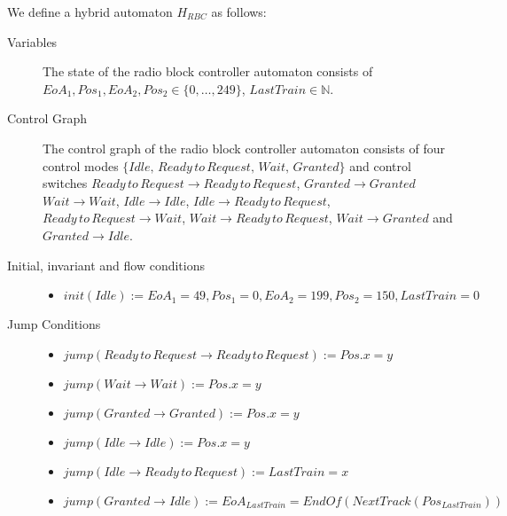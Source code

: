 \begin{mydef}

We define a hybrid automaton $H_{RBC}$ as follows:
\begin{description}
\item[Variables] The state of the radio block controller automaton consists of $EoA_1, Pos_1, EoA_2, Pos_2 \in  \{0, \ldots , 249\}$, $LastTrain \in \mathbb{N}$.

\item[Control Graph] The control graph of the radio block controller automaton consists of four control modes $\{Idle, \, Ready \, to \, Request, \, Wait, \, Granted \}$ and control switches $Ready \, to \, Request \to Ready \, to \, Request$, $Granted \to Granted$ $Wait \to Wait$, $Idle \to Idle$, $Idle \to Ready \, to \, Request$, $Ready \, to \, Request \to Wait$, $Wait \to Ready \, to \, Request$, $Wait \to Granted$ and $Granted \to Idle$.

\item[Initial, invariant and flow conditions] \hspace*{0mm}
	\begin{itemize}
	\item $init(Idle) :=   EoA_1 = 49, Pos_1 = 0, EoA_2 = 199, Pos_2 = 150, LastTrain = 0 $
	\end{itemize}

\item[Jump Conditions] \hspace*{0mm}

	\begin{itemize}
	\item $jump(Ready \, to \, Request \to Ready \, to \, Request) :=  Pos.x = y$
	\item $jump(Wait \to Wait) :=  Pos.x = y$
	\item $jump(Granted \to Granted) :=  Pos.x = y$
	\item $jump(Idle \to Idle) := Pos.x = y$
	\item $jump(Idle \to Ready \, to \, Request) := LastTrain = x$
	\item $jump(Granted \to Idle) := EoA_{LastTrain} = EndOf(NextTrack(Pos_{LastTrain}))$
	\end{itemize}


\end{description}
\end{mydef}
